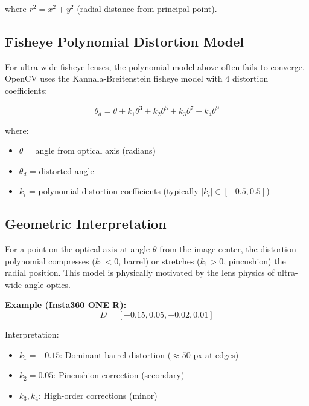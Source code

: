 \documentclass[11pt,a4paper,oneside]{article}
\begin{document}
where $r^2 = x^2 + y^2$ (radial distance from principal point).

\subsection{Fisheye Polynomial Distortion Model}

For ultra-wide fisheye lenses, the polynomial model above often fails to converge. OpenCV uses the Kannala-Breitenstein fisheye model \cite{kannala2006generic} with 4 distortion coefficients:

\begin{equation}
\theta_d = \theta + k_1 \theta^3 + k_2 \theta^5 + k_3 \theta^7 + k_4 \theta^9
\label{eq:fisheye_poly}
\end{equation}

where:
\begin{itemize}
    \item $\theta$ = angle from optical axis (radians)
    \item $\theta_d$ = distorted angle
    \item $k_i$ = polynomial distortion coefficients (typically $|k_i| \in [-0.5, 0.5]$)
\end{itemize}

\subsection{Geometric Interpretation}

For a point on the optical axis at angle $\theta$ from the image center, the distortion polynomial compresses ($k_1 < 0$, barrel) or stretches ($k_1 > 0$, pincushion) the radial position. This model is physically motivated by the lens physics of ultra-wide-angle optics.

\textbf{Example (Insta360 ONE R):}
\begin{equation}
D = [-0.15, 0.05, -0.02, 0.01]
\label{eq:insta360_example}
\end{equation}

Interpretation:
\begin{itemize}
    \item $k_1 = -0.15$: Dominant barrel distortion ($\approx 50$ px at edges)
    \item $k_2 = 0.05$: Pincushion correction (secondary)
    \item $k_3, k_4$: High-order corrections (minor)
\end{itemize}

\end{document}
